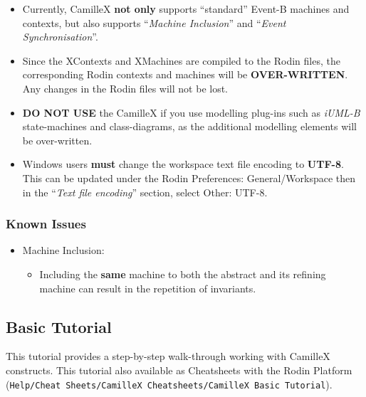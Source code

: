 \begin{itemize}
\item Currently, CamilleX \textbf{not only} supports ``standard'' Event-B machines and contexts, but also supports ``\emph{Machine Inclusion}'' and ``\emph{Event Synchronisation}''.

\item Since the XContexts and XMachines are compiled to the Rodin files, the corresponding Rodin contexts and machines will be \textbf{OVER-WRITTEN}. Any changes in the Rodin files will not be lost.

\item \textbf{DO NOT USE} the CamilleX if you use modelling plug-ins such as \emph{iUML-B} state-machines and class-diagrams, as the additional modelling elements will be over-written.

\item Windows users \textbf{must} change the workspace text file encoding to \textbf{UTF-8}. This can be updated under the Rodin Preferences: General/Workspace then in the ``\emph{Text file encoding}'' section, select Other: UTF-8.

\end{itemize}

\subsubsection{Known Issues}
\label{sec:known-issues}

\begin{itemize}
\item Machine Inclusion: 
\begin{itemize}
	\item Including the \textbf{same} machine to both the abstract and its refining machine can result in the repetition of invariants.
\end{itemize}

\end{itemize}

\subsection{Basic Tutorial}
\label{sec:basic-tutorial}

This tutorial provides a step-by-step walk-through working with CamilleX constructs. This tutorial also available as Cheatsheets with the Rodin Platform (\texttt{Help/Cheat Sheets/CamilleX Cheatsheets/CamilleX Basic Tutorial}).

